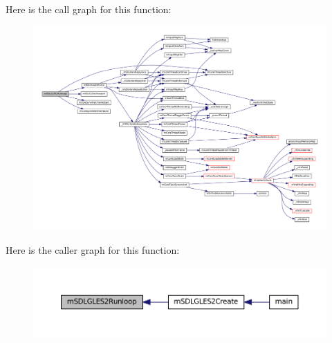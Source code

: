 Here is the call graph for this function\+:
\nopagebreak
\begin{figure}[H]
\begin{center}
\leavevmode
\includegraphics[width=350pt]{gles2-sdl_8c_a2c8ab44370fc9aa148f328f7f4478b6e_cgraph}
\end{center}
\end{figure}
Here is the caller graph for this function\+:
\nopagebreak
\begin{figure}[H]
\begin{center}
\leavevmode
\includegraphics[width=350pt]{gles2-sdl_8c_a2c8ab44370fc9aa148f328f7f4478b6e_icgraph}
\end{center}
\end{figure}
